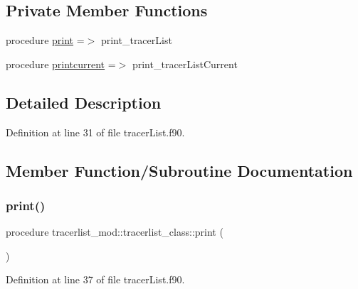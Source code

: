 \subsection*{Private Member Functions}
\begin{DoxyCompactItemize}
\item 
procedure \mbox{\hyperlink{structtracerlist__mod_1_1tracerlist__class_a541eeb1a337ff56743951e7ee337e6e7}{print}} =$>$ print\+\_\+tracer\+List
\item 
procedure \mbox{\hyperlink{structtracerlist__mod_1_1tracerlist__class_aa42325c39e843247df75e317f93c9c5a}{printcurrent}} =$>$ print\+\_\+tracer\+List\+Current
\end{DoxyCompactItemize}


\subsection{Detailed Description}


Definition at line 31 of file tracer\+List.\+f90.



\subsection{Member Function/\+Subroutine Documentation}
\mbox{\label{structtracerlist__mod_1_1tracerlist__class_a541eeb1a337ff56743951e7ee337e6e7}} 
\subsubsection{\texorpdfstring{print()}{print()}}
{\footnotesize\ttfamily procedure tracerlist\+\_\+mod\+::tracerlist\+\_\+class\+::print (\begin{DoxyParamCaption}{ }\end{DoxyParamCaption})\hspace{0.3cm}{\ttfamily [private]}}



Definition at line 37 of file tracer\+List.\+f90.

\mbox{\label{structtracerlist__mod_1_1tracerlist__class_aa42325c39e843247df75e317f93c9c5a}} 
